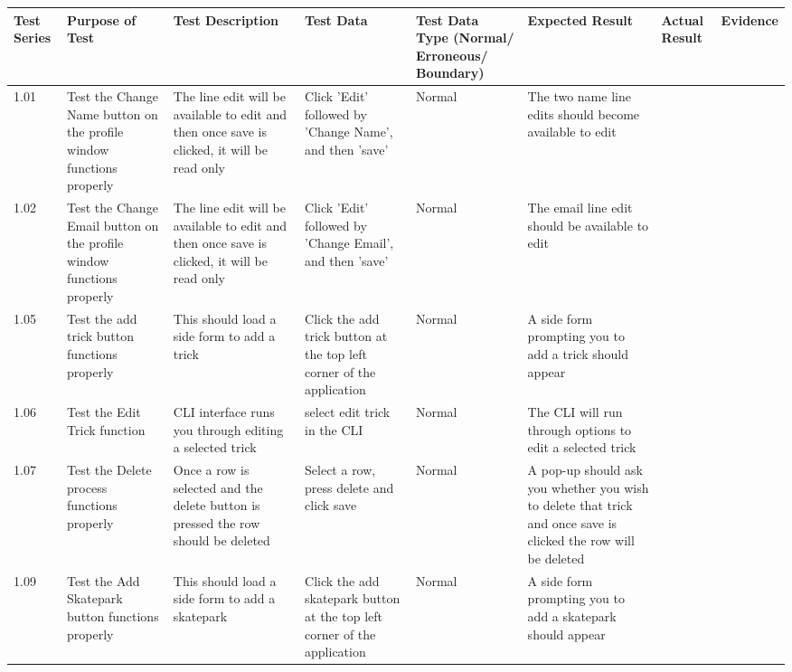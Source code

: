 \begin{landscape}
\begin{center}
    \begin{longtable}{|p{1.5cm}|p{2.5cm}|p{2.5cm}|p{2cm}|p{2cm}|p{2cm}|p{2cm}|p{2cm}|}
        \hline
        \textbf{Test Series} & \textbf{Purpose of Test} & \textbf{Test Description} & \textbf{Test Data} & \textbf{Test Data Type (Normal/ Erroneous/ Boundary)} & \textbf{Expected Result} & \textbf{Actual Result} & \textbf{Evidence}\\ \hline


1.01 & Test the Change Name button on the profile window functions properly & The line edit will be available to edit and then once save is clicked, it will be read only  &  Click 'Edit' followed by 'Change Name', and then 'save' & Normal & The two name line edits should become available to edit & & \\ \hline

1.02 & Test the Change Email button on the profile window functions properly & The line edit will be available to edit and then once save is clicked, it will be read only & Click 'Edit' followed by 'Change Email', and then 'save' & Normal &  The email line edit should be available to edit & &  \\ \hline


1.05 & Test the add trick button functions properly & This should load a side form to add a trick & Click the add trick button at the top left corner of the application & Normal & A side form prompting you to add a trick should appear &  \\ \hline

1.06 & Test the Edit Trick function & CLI interface runs you through editing a selected trick & select edit trick in the CLI & Normal & The CLI will run through options to edit a selected trick &  \\ \hline

1.07 & Test the Delete process functions properly & Once a row is selected and the delete button is pressed the row should be deleted & Select a row, press delete and click save & Normal & A pop-up should ask you whether you wish to delete that trick and once save is clicked the row will be deleted &  \\ \hline



1.09 & Test the Add Skatepark button functions properly &  This should load a side form to add a skatepark & Click the add skatepark button at the top left corner of the application & Normal & A side form prompting you to add a skatepark should appear & &  \\ \hline


\end{longtable}
\end{center}
\end{landscape}
